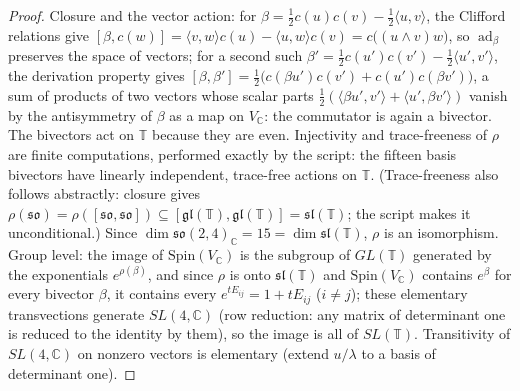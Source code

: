 \documentclass[11pt]{article}
\theoremstyle{definition}
\newcommand{\C}{\mathbb{C}}
\newcommand{\T}{\mathbb{T}}
\newcommand{\ip}[2]{\langle #1, #2\rangle}
\begin{document}
\begin{proof}
Closure and the vector action: for $\beta = \tfrac12 c(u)c(v) - \tfrac12\ip{u}{v}$, the Clifford relations give $[\beta, c(w)] = \ip{v}{w}c(u) - \ip{u}{w}c(v) = c\bigl((u\wedge v)w\bigr)$, so $\operatorname{ad}_\beta$ preserves the space of vectors; for a second such $\beta'= \tfrac12 c(u')c(v') - \tfrac12\ip{u'}{v'}$, the derivation property gives $[\beta, \beta'] = \tfrac12\bigl(c(\beta u')c(v') + c(u')c(\beta v')\bigr)$, a sum of products of two vectors whose scalar parts $\tfrac12(\ip{\beta u'}{v'} + \ip{u'}{\beta v'})$ vanish by the antisymmetry of $\beta$ as a map on $V_\C$: the commutator is again a bivector. The bivectors act on $\T$ because they are even. Injectivity and trace-freeness of $\rho$ are finite computations, performed exactly by the script: the fifteen basis bivectors have linearly independent, trace-free actions on $\T$. (Trace-freeness also follows abstractly: closure gives $\rho(\mathfrak{so}) = \rho([\mathfrak{so},\mathfrak{so}]) \subseteq [\mathfrak{gl}(\T), \mathfrak{gl}(\T)] = \mathfrak{sl}(\T)$; the script makes it unconditional.) Since $\dim \mathfrak{so}(2,4)_\C = 15 = \dim\mathfrak{sl}(\T)$, $\rho$ is an isomorphism. Group level: the image of $\mathrm{Spin}(V_\C)$ is the subgroup of $GL(\T)$ generated by the exponentials $e^{\rho(\beta)}$, and since $\rho$ is onto $\mathfrak{sl}(\T)$ and $\mathrm{Spin}(V_\C)$ contains $e^{\beta}$ for every bivector $\beta$, it contains every $e^{tE_{ij}} = 1 + tE_{ij}$ ($i \neq j$); these elementary transvections generate $SL(4,\C)$ (row reduction: any matrix of determinant one is reduced to the identity by them), so the image is all of $SL(\T)$. Transitivity of $SL(4,\C)$ on nonzero vectors is elementary (extend $u/\lambda$ to a basis of determinant one).
\end{proof}
\end{document}
